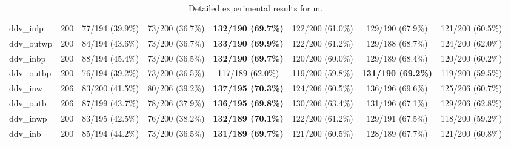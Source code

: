 \begin{landscape}
\begin{table}[h]
{\begin{tabular}[a]{|lc||c|c||c|c||c|c|}
ddv\_inlp      &  200 &   77/194  (39.9\%) &   73/200  (36.7\%) & \textbf{ 132/190  (69.7\%)} &  122/200  (61.0\%) &    129/190  (67.9\%) &  121/200  (60.5\%)  \\
ddv\_outwp     &  200 &   84/194  (43.6\%) &   73/200  (36.7\%) & \textbf{ 133/190  (69.9\%)} &  122/200  (61.2\%) &    129/188  (68.7\%) &  124/200  (62.0\%)  \\
ddv\_inbp      &  200 &   88/194  (45.4\%) &   73/200  (36.5\%) & \textbf{ 132/190  (69.7\%)} &  120/200  (60.0\%) &    129/189  (68.4\%) &  120/200  (60.2\%)  \\
ddv\_outbp     &  200 &   76/194  (39.2\%) &   73/200  (36.5\%) &  117/189  (62.0\%) &  119/200  (59.8\%) &   \textbf{ 131/190  (69.2\%)} &  119/200  (59.5\%)  \\
ddv\_inw       &  206 &   83/200  (41.5\%) &   80/206  (39.2\%) & \textbf{ 137/195  (70.3\%)} &  124/206  (60.5\%) &     136/196  (69.6\%) &  125/206  (60.7\%)  \\
ddv\_outb      &  206 &   87/199  (43.7\%) &   78/206  (37.9\%) & \textbf{ 136/195  (69.8\%)} &  130/206  (63.4\%) &    131/196  (67.1\%) &  129/206  (62.8\%)  \\
ddv\_inwp      &  200 &   83/195  (42.5\%) &   76/200  (38.2\%) & \textbf{ 132/189  (70.1\%)} &  122/200  (61.2\%) &    129/191  (67.5\%) &  118/200  (59.2\%)  \\
ddv\_inb       &  200 &   85/194  (44.2\%) &   73/200  (36.5\%) & \textbf{ 131/189  (69.7\%)} &  121/200  (60.5\%) &    128/189  (67.7\%) &  121/200  (60.8\%)  \\
\hline
      \end{tabular}}
    \caption{Detailed experimental results for m.}
    \label{tab:exp_d}
\end{table}
\end{landscape}
